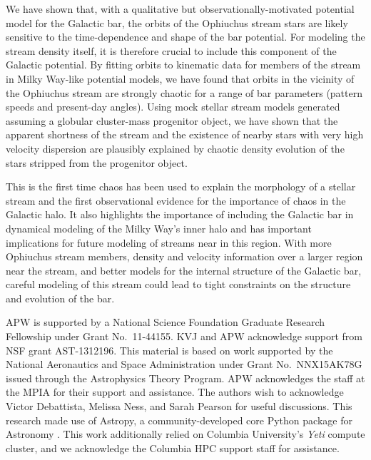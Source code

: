 \documentclass[numberedappendix]{emulateapj}
\begin{document}
We have shown that, with a qualitative but observationally-motivated potential model for the Galactic bar, the orbits of the Ophiuchus stream stars are likely sensitive to the time-dependence and shape of the bar potential. For modeling the stream density itself, it is therefore crucial to include this component of the Galactic potential. By fitting orbits to kinematic data for members of the stream in Milky Way-like potential models, we have found that orbits in the vicinity of the Ophiuchus stream are strongly chaotic for a range of bar parameters (pattern speeds and present-day angles). Using mock stellar stream models generated assuming a globular cluster-mass progenitor object, we have shown that the apparent shortness of the stream and the existence of nearby stars with very high velocity dispersion are plausibly explained by chaotic density evolution of the stars stripped from the progenitor object. 

This is the first time chaos has been used to explain the morphology of a stellar stream and the first observational evidence for the importance of chaos in the Galactic halo. It also highlights the importance of including the Galactic bar in dynamical modeling of the Milky Way's inner halo and has important implications for future modeling of streams near in this region. With more Ophiuchus stream members, density and velocity information over a larger region near the stream, and better models for the internal structure of the Galactic bar, careful modeling of this stream could lead to tight constraints on the structure and evolution of the bar.

\acknowledgements
APW is supported by a National Science Foundation Graduate Research Fellowship under Grant No.\ 11-44155.
KVJ and APW acknowledge support from NSF grant AST-1312196. 
This material is based on work supported by the National Aeronautics and Space Administration under Grant No.\, NNX15AK78G issued through the Astrophysics Theory Program. 
APW acknowledges the staff at the MPIA for their support and assistance.
The authors wish to acknowledge Victor Debattista, Melissa Ness, and Sarah Pearson for useful discussions.
This research made use of Astropy, a community-developed core Python package for Astronomy \citep{astropy13}.
This work additionally relied on Columbia University's \emph{Yeti} compute cluster, and we acknowledge the Columbia HPC support staff for assistance. \\

\end{document}
